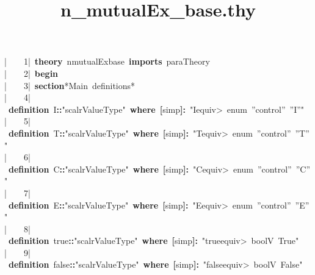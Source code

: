 \documentclass{article}
\title{n_mutualEx_base.thy}
\newcommand{\syntaxNULL}[1]{\textcolor[rgb]{0.0,0.0,0.0}{#1}}
\newcommand{\syntaxCOMMENTC}[1]{\textcolor[rgb]{0.4,0.0,0.8}{#1}}
\newcommand{\syntaxKEYWORDA}[1]{\textcolor[rgb]{0.0,0.4,0.6}{\textbf{#1}}}
\newcommand{\syntaxKEYWORDB}[1]{\textcolor[rgb]{0.0,0.6,0.4}{\textbf{#1}}}
\newcommand{\syntaxLITERALA}[1]{\textcolor[rgb]{1.0,0.0,0.8}{#1}}
\newcommand{\syntaxOPERATOR}[1]{\textcolor[rgb]{0.0,0.0,0.0}{\textbf{#1}}}
\newcommand{\syntaxNULL}[1]{\textcolor[rgb]{0.0,0.0,0.0}{#1}}
\newcommand{\syntaxCOMMENTC}[1]{\textcolor[rgb]{0.4,0.0,0.8}{#1}}
\newcommand{\syntaxKEYWORDA}[1]{\textcolor[rgb]{0.0,0.4,0.6}{\textbf{#1}}}
\newcommand{\syntaxKEYWORDB}[1]{\textcolor[rgb]{0.0,0.6,0.4}{\textbf{#1}}}
\newcommand{\syntaxLITERALA}[1]{\textcolor[rgb]{1.0,0.0,0.8}{#1}}
\newcommand{\syntaxOPERATOR}[1]{\textcolor[rgb]{0.0,0.0,0.0}{\textbf{#1}}}
\newcommand{\syntaxNULL}[1]{\textcolor[rgb]{0.0,0.0,0.0}{#1}}
\newcommand{\syntaxCOMMENTC}[1]{\textcolor[rgb]{0.4,0.0,0.8}{#1}}
\newcommand{\syntaxKEYWORDA}[1]{\textcolor[rgb]{0.0,0.4,0.6}{\textbf{#1}}}
\newcommand{\syntaxKEYWORDB}[1]{\textcolor[rgb]{0.0,0.6,0.4}{\textbf{#1}}}
\newcommand{\syntaxLITERALA}[1]{\textcolor[rgb]{1.0,0.0,0.8}{#1}}
\newcommand{\syntaxOPERATOR}[1]{\textcolor[rgb]{0.0,0.0,0.0}{\textbf{#1}}}
\newcommand{\syntaxNULL}[1]{\textcolor[rgb]{0.0,0.0,0.0}{\textbf{#1}}}
\newcommand{\syntaxCOMMENTC}[1]{\textcolor[rgb]{0.4,0.0,0.8}{\textbf{#1}}}
\newcommand{\syntaxKEYWORDA}[1]{\textcolor[rgb]{0.0,0.4,0.6}{#1}}
\newcommand{\syntaxKEYWORDB}[1]{\textcolor[rgb]{0.0,0.6,0.4}{#1}}
\newcommand{\syntaxLITERALA}[1]{\textcolor[rgb]{1.0,0.0,0.8}{\textbf{#1}}}
\newcommand{\syntaxOPERATOR}[1]{\textcolor[rgb]{0.0,0.0,0.0}{#1}}
\newcommand{\syntaxNULL}[1]{\textcolor[rgb]{0.0,0.0,0.0}{#1}}
\newcommand{\syntaxCOMMENTC}[1]{\textcolor[rgb]{0.4,0.0,0.8}{#1}}
\newcommand{\syntaxKEYWORDA}[1]{\textcolor[rgb]{0.0,0.4,0.6}{#1}}
\newcommand{\syntaxKEYWORDB}[1]{\textcolor[rgb]{0.0,0.6,0.4}{#1}}
\newcommand{\syntaxLITERALA}[1]{\textcolor[rgb]{1.0,0.0,0.8}{#1}}
\newcommand{\syntaxOPERATOR}[1]{\textcolor[rgb]{0.0,0.0,0.0}{#1}}
\newcommand{\syntaxNULL}[1]{\textcolor[rgb]{0.0,0.0,0.0}{#1}}
\newcommand{\syntaxCOMMENTC}[1]{\textcolor[rgb]{0.4,0.0,0.8}{#1}}
\newcommand{\syntaxKEYWORDA}[1]{\textcolor[rgb]{0.0,0.4,0.6}{\textbf{#1}}}
\newcommand{\syntaxKEYWORDB}[1]{\textcolor[rgb]{0.0,0.6,0.4}{\textbf{#1}}}
\newcommand{\syntaxLITERALA}[1]{\textcolor[rgb]{1.0,0.0,0.8}{#1}}
\newcommand{\syntaxOPERATOR}[1]{\textcolor[rgb]{0.0,0.0,0.0}{\textbf{#1}}}
\newcommand{\syntaxNULL}[1]{\textcolor[rgb]{1.0,1.0,1.0}{#1}}
\newcommand{\gutter}[1]{\textcolor[rgb]{0,0,0}{{|}#1}}
\newcommand{\gutterH}[1]{\textcolor[rgb]{1,0,0}{{|}#1}}
\begin{document}
\pagecolor{bgcolor}
\noindent
\ttfamily
\syntaxNULL{}\gutter{\ \ \ \ 1{|}\ }\syntaxKEYWORDA{theory}{\ }n\usebox{\underscorebox}mutualEx\usebox{\underscorebox}base{\ }\syntaxKEYWORDB{imports}{\ }paraTheory\hspace*{\fill}\\
\gutter{\ \ \ \ 2{|}\ }\syntaxKEYWORDB{begin}\hspace*{\fill}\\
\gutter{\ \ \ \ 3{|}\ }\syntaxKEYWORDA{section}\syntaxCOMMENTC{\usebox{\opencurlybracket}*Main{\ }definitions*\usebox{\closecurlybracket}}\hspace*{\fill}\\
\gutter{\ \ \ \ 4{|}\ }\syntaxKEYWORDA{definition}{\ }I\syntaxOPERATOR{::}\syntaxLITERALA{"scalrValueType"}{\ }\syntaxKEYWORDB{where}{\ }\syntaxOPERATOR{{[}}simp\syntaxOPERATOR{{]}}\syntaxOPERATOR{:}{\ }\syntaxLITERALA{"I\<equiv>{\ }enum{\ }''control''{\ }''I''"}\hspace*{\fill}\\
\gutterH{\ \ \ \ 5{|}\ }\syntaxKEYWORDA{definition}{\ }T\syntaxOPERATOR{::}\syntaxLITERALA{"scalrValueType"}{\ }\syntaxKEYWORDB{where}{\ }\syntaxOPERATOR{{[}}simp\syntaxOPERATOR{{]}}\syntaxOPERATOR{:}{\ }\syntaxLITERALA{"T\<equiv>{\ }enum{\ }''control''{\ }''T''"}\hspace*{\fill}\\
\gutter{\ \ \ \ 6{|}\ }\syntaxKEYWORDA{definition}{\ }C\syntaxOPERATOR{::}\syntaxLITERALA{"scalrValueType"}{\ }\syntaxKEYWORDB{where}{\ }\syntaxOPERATOR{{[}}simp\syntaxOPERATOR{{]}}\syntaxOPERATOR{:}{\ }\syntaxLITERALA{"C\<equiv>{\ }enum{\ }''control''{\ }''C''"}\hspace*{\fill}\\
\gutter{\ \ \ \ 7{|}\ }\syntaxKEYWORDA{definition}{\ }E\syntaxOPERATOR{::}\syntaxLITERALA{"scalrValueType"}{\ }\syntaxKEYWORDB{where}{\ }\syntaxOPERATOR{{[}}simp\syntaxOPERATOR{{]}}\syntaxOPERATOR{:}{\ }\syntaxLITERALA{"E\<equiv>{\ }enum{\ }''control''{\ }''E''"}\hspace*{\fill}\\
\gutter{\ \ \ \ 8{|}\ }\syntaxKEYWORDA{definition}{\ }true\syntaxOPERATOR{::}\syntaxLITERALA{"scalrValueType"}{\ }\syntaxKEYWORDB{where}{\ }\syntaxOPERATOR{{[}}simp\syntaxOPERATOR{{]}}\syntaxOPERATOR{:}{\ }\syntaxLITERALA{"true\<equiv>{\ }boolV{\ }True"}\hspace*{\fill}\\
\gutter{\ \ \ \ 9{|}\ }\syntaxKEYWORDA{definition}{\ }false\syntaxOPERATOR{::}\syntaxLITERALA{"scalrValueType"}{\ }\syntaxKEYWORDB{where}{\ }\syntaxOPERATOR{{[}}simp\syntaxOPERATOR{{]}}\syntaxOPERATOR{:}{\ }\syntaxLITERALA{"false\<equiv>{\ }boolV{\ }False"}\hspace*{\fill}\\
\end{document}
